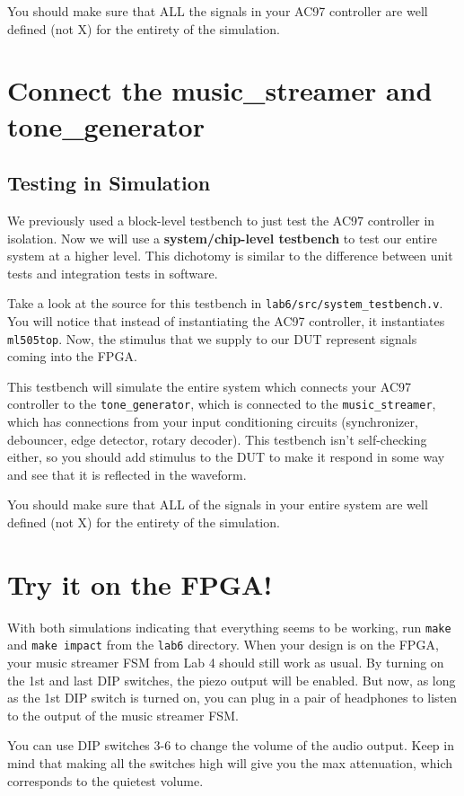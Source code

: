 \documentclass[11pt]{article}
\begin{document}
You should make sure that ALL the signals in your AC97 controller are well defined (not X) for the entirety of the simulation.

\section{Connect the music\_streamer and tone\_generator}

\subsection{Testing in Simulation}
We previously used a block-level testbench to just test the AC97 controller in isolation. Now we will use a \textbf{system/chip-level testbench} to test our entire system at a higher level. This dichotomy is similar to the difference between unit tests and integration tests in software.

Take a look at the source for this testbench in \verb|lab6/src/system_testbench.v|. You will notice that instead of instantiating the AC97 controller, it instantiates \verb|ml505top|. Now, the stimulus that we supply to our DUT represent signals coming into the FPGA.

This testbench will simulate the entire system which connects your AC97 controller to the \verb|tone_generator|, which is connected to the \verb|music_streamer|, which has connections from your input conditioning circuits (synchronizer, debouncer, edge detector, rotary decoder). This testbench isn't self-checking either, so you should add stimulus to the DUT to make it respond in some way and see that it is reflected in the waveform.

You should make sure that ALL of the signals in your entire system are well defined (not X) for the entirety of the simulation.

\section{Try it on the FPGA!}
With both simulations indicating that everything seems to be working, run \verb|make| and \verb|make impact| from the \verb|lab6| directory. When your design is on the FPGA, your music streamer FSM from Lab 4 should still work as usual. By turning on the 1st and last DIP switches, the piezo output will be enabled. But now, as long as the 1st DIP switch is turned on, you can plug in a pair of headphones to listen to the output of the music streamer FSM. 

You can use DIP switches 3-6 to change the volume of the audio output. Keep in mind that making all the switches high will give you the max attenuation, which corresponds to the quietest volume.
\end{document}
